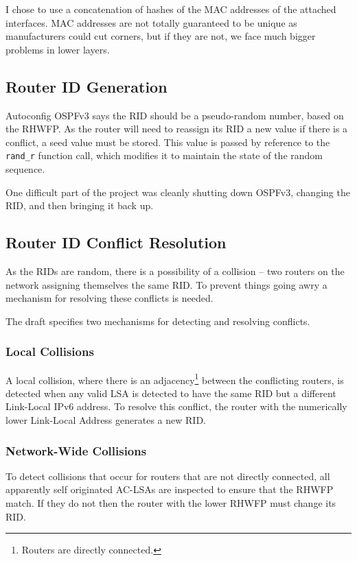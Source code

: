 \documentclass[12pt,a4paper,twoside]{report}
\begin{document}
I chose to use a concatenation of hashes of the MAC  addresses of the attached interfaces.
MAC addresses are not totally guaranteed to be unique as manufacturers could
cut corners, but if they are not, we face much bigger problems in lower layers.

\subsection{Router ID Generation}
Autoconfig OSPFv3 says the RID should be a pseudo-random number, based on
the RHWFP\@. As the router will need to reassign its RID a new value if
there is a conflict, a seed value must be stored. This value is passed by
reference to the \texttt{rand\_r} function call, which modifies it to maintain
the state of the random sequence.

One difficult part of the project was cleanly shutting down OSPFv3, changing
the RID, and then bringing it back up. 

\subsection{Router ID Conflict Resolution}
As the RIDs are random, there is a possibility of a collision -- two
routers on the network assigning themselves the same RID\@. To prevent
things going awry a mechanism for resolving these conflicts is needed. 

The draft specifies two mechanisms for detecting and resolving conflicts. 

\subsubsection{Local Collisions}
A local collision, where there is an adjacency\footnote{Routers are
directly connected.} between the conflicting routers, is detected when any
valid LSA is detected to have the same RID but a different Link-Local
IPv6 address. To resolve this conflict, the router with the numerically lower
Link-Local Address generates a new RID\@. 

\subsubsection{Network-Wide Collisions}
To detect collisions that occur for routers that are not directly connected,
all apparently self originated AC-LSAs are inspected to ensure that the RHWFP
match. If they do not then the router with the lower RHWFP must change its
RID.
\end{document}
